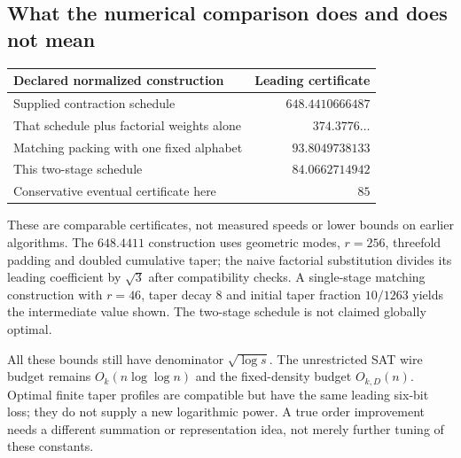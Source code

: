 \subsection{What the numerical comparison does and does not mean}
\begin{center}
\begin{tabular}{@{}lr@{}}\toprule
Declared normalized construction & Leading certificate\\\midrule
Supplied contraction schedule & $648.4410666487$\\
That schedule plus factorial weights alone & $374.3776\ldots$\\
Matching packing with one fixed alphabet & $93.8049738133$\\
This two-stage schedule & $84.0662714942$\\
Conservative eventual certificate here & $85$\\\bottomrule
\end{tabular}
\end{center}
These are comparable certificates, not measured speeds or lower bounds on earlier algorithms.
The $648.4411$ construction uses geometric modes, $r=256$, threefold padding and doubled
cumulative taper; the naive factorial substitution divides its leading coefficient by
$\sqrt3$ after compatibility checks. A single-stage matching construction with $r=46$,
taper decay $8$ and initial taper fraction $10/1263$ yields the intermediate value shown.
The two-stage schedule is not claimed globally optimal.

All these bounds still have denominator $\sqrt{\log s}$. The unrestricted SAT wire budget
remains $O_k(n\log\log n)$ and the fixed-density budget $O_{k,D}(n)$.
Optimal finite taper profiles are compatible but have the same leading six-bit loss;
they do not supply a new logarithmic power. A true order improvement needs a different
summation or representation idea, not merely further tuning of these constants.
